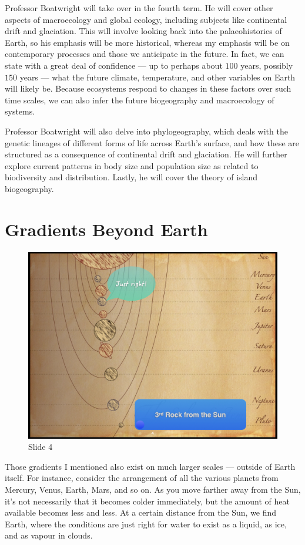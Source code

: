 \documentclass[
  12pt,
]{book}
\begin{document}
Professor Boatwright will take over in the fourth term. He will cover
other aspects of macroecology and global ecology, including subjects
like continental drift and glaciation. This will involve looking back
into the palaeohistories of Earth, so his emphasis will be more
historical, whereas my emphasis will be on contemporary processes and
those we anticipate in the future. In fact, we can state with a great
deal of confidence --- up to perhaps about \(100\) years, possibly
\(150\) years --- what the future climate, temperature, and other
variables on Earth will likely be. Because ecosystems respond to changes
in these factors over such time scales, we can also infer the future
biogeography and macroecology of systems.

Professor Boatwright will also delve into phylogeography, which deals
with the genetic lineages of different forms of life across Earth's
surface, and how these are structured as a consequence of continental
drift and glaciation. He will further explore current patterns in body
size and population size as related to biodiversity and distribution.
Lastly, he will cover the theory of island biogeography.

\section{Gradients Beyond Earth}\label{gradients-beyond-earth}

\begin{figure}[ht]
\centering
\includegraphics[width=0.8\linewidth]{../images/BDC334/BDC334-004.jpeg}
\caption*{Slide 4}
\end{figure}

Those gradients I mentioned also exist on much larger scales --- outside
of Earth itself. For instance, consider the arrangement of all the
various planets from Mercury, Venus, Earth, Mars, and so on. As you move
farther away from the Sun, it's not necessarily that it becomes colder
immediately, but the amount of heat available becomes less and less. At
a certain distance from the Sun, we find Earth, where the conditions are
just right for water to exist as a liquid, as ice, and as vapour in
clouds.
\end{document}

